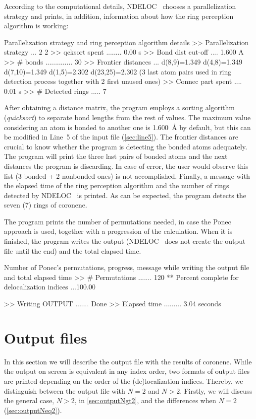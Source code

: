 \documentclass[a4paper,11pt,openany]{memoir}
\newcommand\programa{\textsc{NDELOC}}
\begin{document}
According to the computational details, \programa~ chooses a parallelization strategy and prints, in addition, information about how the ring perception algorithm is working:
\begin{recuadro}{Parallelization strategy and ring perception algorithm details}
>> Parallelization strategy ... 2 2
>> qcksort spent ........ 0.00 s
>> Bond dist cut-off .... 1.600 A
>> # bonds .............. 30
>> Frontier distances ... d(8,9)=1.349 d(4,8)=1.349 d(7,10)=1.349
                          d(1,5)=2.302 d(23,25)=2.302
                          (3 last atom pairs used in ring detection
                           process together with 2 first unused ones)
>> Connec part spent .... 0.01 s
>> # Detected rings ..... 7
\end{recuadro}
After obtaining a distance matrix, the program employs a sorting algorithm (\emph{quicksort}) to separate bond lengths from the rest of values. The maximum value considering an atom is bonded to another one is \SI{1.600}{\angstrom} by default, but this can be modified in Line~5 of the input file (\autoref{sec:line5}). The frontier distances are crucial to know whether the program is detecting the bonded atoms adequately. The program will print the three last pairs of bonded atoms and the next distances the program is discarding. In case of error, the user would observe this list (3 bonded + 2 nonbonded ones) is not accomplished. Finally, a message with the elapsed time of the ring perception algorithm and the number of rings detected by \programa~ is printed. As can be expected, the program detects the seven (7) rings of coronene.

The program prints the number of permutations needed, in case the Ponec approach is used, together with a progression of the calculation. When it is finished, the program writes the output (\programa~ does not create the output file until the end) and the total elapsed time.
\begin{recuadro}{Number of Ponec's permutations, progress, message while writing the output file and total elapsed time}
>> # Permutations ....... 120
** Percent complete for delocalization indices ...100.00%

>> Writing OUTPUT ....... Done
>> Elapsed time ......... 3.04 seconds
\end{recuadro}

\chapter{Output files}\label{chap:output}
In this section we will describe the output file with the results of coronene. While the output on screen is equivalent in any index order, two formats of output files are printed depending on the order of the (de)localization indices. Thereby, we distinguish between the output file with $N=2$ and $N>2$. Firstly, we will discuss the general case, $N>2$, in \autoref{sec:outputNgt2}, and the differences when $N=2$ (\autoref{sec:outputNeq2}).
\end{document}
